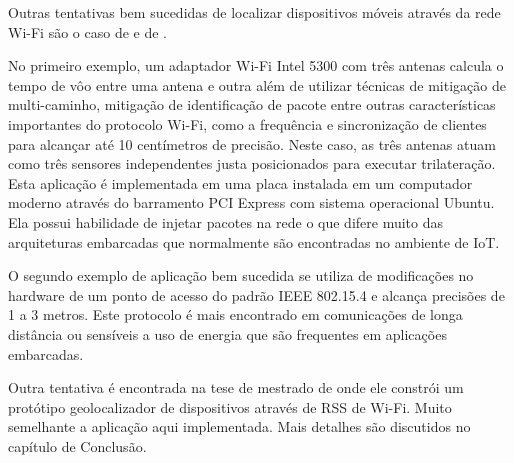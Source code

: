 Outras tentativas bem sucedidas de localizar dispositivos móveis através da rede
Wi-Fi são o caso de  e de .

No primeiro exemplo, um adaptador Wi-Fi Intel 5300 com três antenas calcula o tempo
de vôo entre uma antena e outra além de utilizar técnicas de mitigação de
multi-caminho, mitigação de identificação de pacote entre outras características
importantes do protocolo Wi-Fi, como a frequência e sincronização de clientes
para alcançar até 10 centímetros de precisão. Neste caso, as três antenas atuam
como três sensores independentes justa posicionados para executar trilateração.
Esta aplicação é implementada em uma placa instalada em um computador moderno
através do barramento PCI Express com sistema operacional Ubuntu. Ela possui habilidade
de injetar pacotes na rede o que difere muito das arquiteturas embarcadas que
normalmente são encontradas no ambiente de IoT.

O segundo exemplo de aplicação bem sucedida se utiliza de modificações no
hardware de um ponto de acesso do padrão IEEE 802.15.4 e alcança precisões de 1 a 3
metros. Este protocolo é mais encontrado em comunicações de longa distância ou
sensíveis a uso de energia que são frequentes em aplicações embarcadas.

Outra tentativa é encontrada na tese de mestrado de  onde ele constrói
um protótipo geolocalizador de dispositivos através de RSS de Wi-Fi. Muito semelhante a aplicação
aqui implementada. Mais detalhes são discutidos no capítulo de Conclusão.
